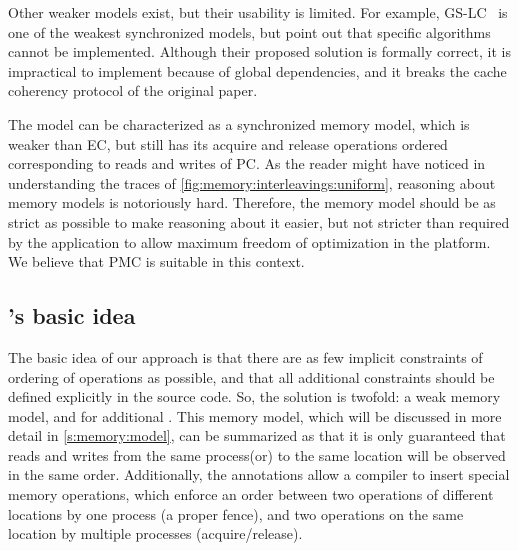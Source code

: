Other weaker models exist, but their usability is limited.
For example, \acl{GS-LC}~\cite{gao:location_consistency} is one of the weakest synchronized models, but \citet{long:enh_location_consistency} point out that specific algorithms cannot be implemented.
Although their proposed solution is formally correct, it is impractical to implement because of global dependencies, and it breaks the cache coherency protocol of the original paper.

The  model can be characterized as a synchronized memory model, which is weaker than \ac{EC}, but still has its acquire and release operations ordered corresponding to reads and writes of \ac{PC}.
As the reader might have noticed in understanding the traces of \cref{fig:memory:interleavings:uniform}, reasoning about memory models is notoriously hard.
Therefore, the memory model should be as strict as possible to make reasoning about it easier, but not stricter than required by the application to allow maximum freedom of optimization in the platform.
We believe that \ac{PMC} is suitable in this context.

\subsection{'s basic idea}

The basic idea of our approach is that there are as few implicit constraints of ordering of operations as possible, and that all additional constraints should be defined explicitly in the source code.
So, the solution is twofold: a weak memory model, and  for additional .
This memory model, which will be discussed in more detail in \cref{s:memory:model}, can be summarized as that it is only guaranteed that reads and writes from the same process(or) to the same location will be observed in the same order.
Additionally, the annotations allow a compiler to insert special memory operations, which enforce an order between two operations of different locations by one process (a proper fence), and two operations on the same location by multiple processes (acquire/release).

